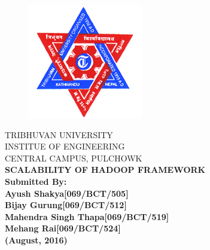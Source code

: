 \newpage
{}
\begin{figure}[t]
        \centering
        \includegraphics[width=50mm]{tu-logo.jpg}
\end{figure}
\begin{nscenter}
        TRIBHUVAN UNIVERSITY\\ 
        INSTITUE OF ENGINEERING\\
        CENTRAL CAMPUS, PULCHOWK\\
        \vspace{21mm}
        \bfseries{
                SCALABILITY OF HADOOP FRAMEWORK\\
        }
        \vspace{14mm}
        \textbf {Submitted By:}\\
        \textnormal{
                Ayush Shakya\hspace{25mm}[069/BCT/505]\\
                Bijay Gurung\hspace{25mm}[069/BCT/512]\\
                Mahendra Singh Thapa\hspace{9mm}[069/BCT/519]\\
                Mehang Rai\hspace{28mm}[069/BCT/524]\\
        } 
        \vspace{38mm}
                (August, 2016)
\end{nscenter}
